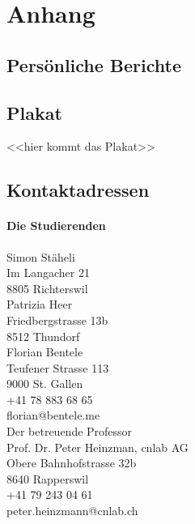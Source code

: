 \chapter{Anhang}



\section{Persönliche Berichte}
















\section{Plakat}
<<hier kommt das Plakat>>

\section{Kontaktadressen}
\subsubsection{Die Studierenden}

Simon Stäheli\\
Im Langacher 21\\
8805 Richterswil\\

Patrizia Heer\\
Friedbergstrasse 13b\\
8512 Thundorf\\

Florian Bentele\\
Teufener Strasse 113\\
9000 St. Gallen\\
+41 78 883 68 65\\
florian@bentele.me\\

Der betreuende Professor\\
Prof. Dr. Peter Heinzman, cnlab AG\\
Obere Bahnhofstrasse 32b\\
8640 Rapperswil\\
+41 79 243 04 61\\
peter.heinzmann@cnlab.ch\\

